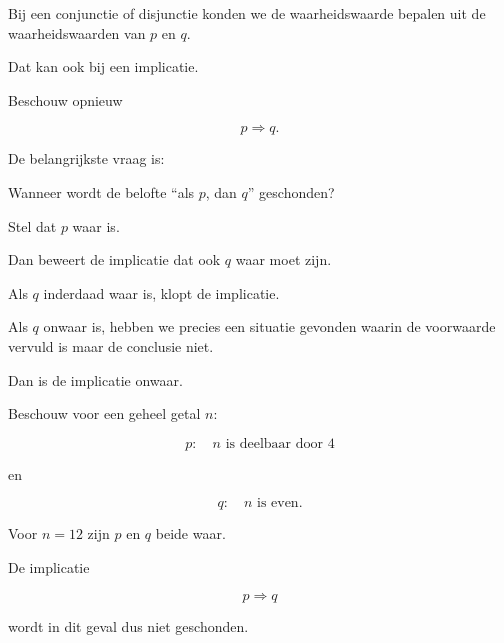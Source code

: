 \documentclass{ximera}
\begin{document}

Bij een conjunctie of disjunctie konden we de waarheidswaarde bepalen
uit de waarheidswaarden van $p$ en $q$.

Dat kan ook bij een implicatie.

Beschouw opnieuw

\[
p\Rightarrow q.
\]

De belangrijkste vraag is:

\begin{center}
Wanneer wordt de belofte ``als $p$, dan $q$'' geschonden?
\end{center}



Stel dat $p$ waar is.

Dan beweert de implicatie dat ook $q$ waar moet zijn.

Als $q$ inderdaad waar is, klopt de implicatie.

Als $q$ onwaar is, hebben we precies een situatie gevonden waarin
de voorwaarde vervuld is maar de conclusie niet.

Dan is de implicatie onwaar.


\begin{voorbeeld}

Beschouw voor een geheel getal $n$:

\[
p:\quad n\text{ is deelbaar door }4
\]

en

\[
q:\quad n\text{ is even}.
\]

Voor $n=12$ zijn $p$ en $q$ beide waar.

De implicatie

\[
p\Rightarrow q
\]

wordt in dit geval dus niet geschonden.

\end{voorbeeld}
\end{document}

